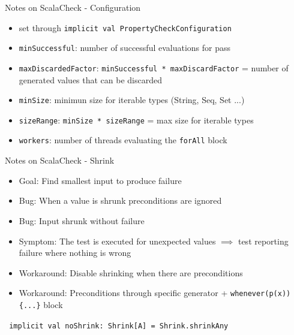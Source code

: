 \documentclass[xcolor=svgnames,handout]{beamer}
\begin{document}
    \begin{frame}
    {Notes on ScalaCheck - Configuration}

        \begin{itemize}
            \item set through \texttt{implicit val PropertyCheckConfiguration}
            \item \texttt{minSuccessful}: number of successful evaluations for pass
            \item \texttt{maxDiscardedFactor}: \texttt{minSuccessful * maxDiscardFactor} = number of generated values that can be discarded
            \item \texttt{minSize}: minimun size for iterable types (String, Seq, Set ...)
            \item \texttt{sizeRange}: \texttt{minSize * sizeRange} = max size for iterable types
            \item \texttt{workers}: number of threads evaluating the \texttt{forAll} block
        \end{itemize}

    \end{frame}

    \begin{frame}
    {Notes on ScalaCheck - Shrink}

        \begin{itemize}
            \item Goal: Find smallest input to produce failure
            \item Bug: When a value is shrunk preconditions are ignored
            \item Bug: Input shrunk without failure
            \item Symptom: The test is executed for unexpected values $\implies$ test reporting failure where nothing is wrong
            \item Workaround: Disable shrinking when there are preconditions
            \item Workaround: Preconditions through specific generator + \texttt{whenever(p(x)) \{...\}} block
        \end{itemize}

        \texttt{ implicit val noShrink: Shrink[A] = Shrink.shrinkAny }

    \end{frame}
\end{document}
